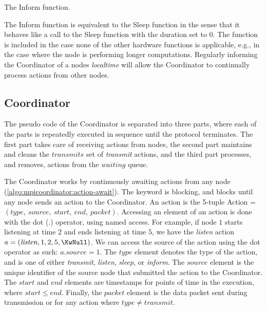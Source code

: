 \begin{algorithm}[ht]
    \DontPrintSemicolon
    
    
    \caption{The Inform function.}
    \label{algo:hwfuncsupdatelocaltime}
\end{algorithm}

The Inform function is equivalent to the Sleep function in the sense that it behaves like a call to the Sleep
function with the duration set to 0. The function is included in the case none of the other hardware
functions is applicable, e.g., in the case where the node is performing longer computations. Regularly
informing the Coordinator of a nodes \textit{localtime} will allow the Coordinator to continually process actions from
other nodes.

\subsection{Coordinator}\label{sec:coordinatorpseudo}
The pseudo code of the Coordinator is separated into three parts, where each of the parts is repeatedly
executed in sequence until the protocol terminates. The first part takes care of receiving actions from
nodes, the second part maintains and cleans the $\mathit{transmits}$ set of \textit{transmit} actions, and the
third part processes, and removes, actions from the $\mathit{waiting}$ queue. \medbreak

The Coordinator works by continuously awaiting actions from any node
(\autoref{algo:mpicoordinator:action-await}). The \KwAwait keyword is blocking, and blocks until any node
sends an action to the Coordinator. An action is the 5-tuple Action = $(\mathit{type},\ \mathit{source},\
\mathit{start},\ \mathit{end},\ \mathit{packet})$. Accessing an element of an action is done with the dot
($.$) operator, using named access. For example, if node $1$ starts listening at time $2$ and ends listening
at time $5$, we have the \textit{listen} action $a = (\mathit{listen}, 1, 2, 5, \KwNull)$. We can access the
source of the action using the dot operator as such: $a.source = 1$. The $\mathit{type}$ element denotes the
type of the action, and is one of either \textit{transmit}, \textit{listen}, \textit{sleep}, or
\textit{inform}. The $\mathit{source}$ element is the unique identifier of the source node that submitted the
action to the Coordinator. The $\mathit{start}$ and $\mathit{end}$ elements are timestamps for points of time
in the execution, where $\mathit{start} \leq \mathit{end}$. Finally, the $\mathit{packet}$ element is the data
packet sent during transmission or \KwNull for any action where $\mathit{type} \neq \mathit{transmit}$.
\medbreak

